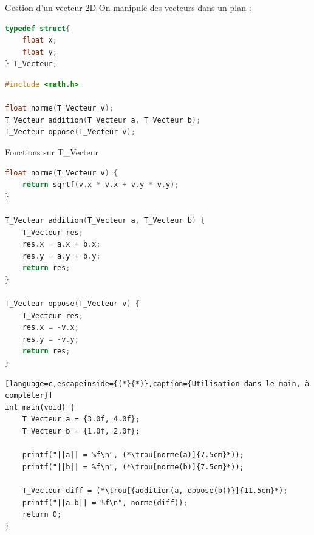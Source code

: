 
\begin{UPSTIexercice}{Gestion d’un vecteur 2D}
    On manipule des vecteurs dans un plan :
    \begin{lstlisting}[language=C]
typedef struct{
    float x;
    float y;
} T_Vecteur;
\end{lstlisting}


    \begin{lstlisting}[language=c,caption={Prototypes}]
#include <math.h>

float norme(T_Vecteur v);
T_Vecteur addition(T_Vecteur a, T_Vecteur b);
T_Vecteur oppose(T_Vecteur v);
\end{lstlisting}

\begin{UPSTIeleveOnlyEnv}
\end{UPSTIeleveOnlyEnv}

\begin{UPSTIcorrectionP}{Fonctions sur T\_Vecteur}
\begin{lstlisting}[language=c,caption={Correction}]
float norme(T_Vecteur v) {
    return sqrtf(v.x * v.x + v.y * v.y);
}

T_Vecteur addition(T_Vecteur a, T_Vecteur b) {
    T_Vecteur res;
    res.x = a.x + b.x;
    res.y = a.y + b.y;
    return res;
}

T_Vecteur oppose(T_Vecteur v) {
    T_Vecteur res;
    res.x = -v.x;
    res.y = -v.y;
    return res;
}
\end{lstlisting}
\end{UPSTIcorrectionP}

    \begin{lstlisting}[language=c,escapeinside={(*}{*)},caption={Utilisation dans le main, à compléter}]
int main(void) {
    T_Vecteur a = {3.0f, 4.0f};
    T_Vecteur b = {1.0f, 2.0f};

    printf("||a|| = %f\n", (*\trou[norme(a)]{7.5cm}*));
    printf("||b|| = %f\n", (*\trou[norme(b)]{7.5cm}*));

    T_Vecteur diff = (*\trou[{addition(a, oppose(b))}]{11.5cm}*);
    printf("||a-b|| = %f\n", norme(diff));
    return 0;
}
\end{lstlisting}
\end{UPSTIexercice}

